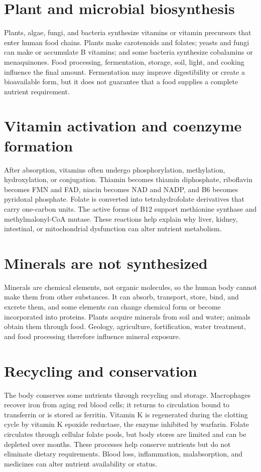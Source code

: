 \section{Plant and microbial biosynthesis}
Plants, algae, fungi, and bacteria synthesize vitamins or vitamin precursors that enter human food chains. Plants make carotenoids and folates; yeasts and fungi can make or accumulate B vitamins; and some bacteria synthesize cobalamins or menaquinones. Food processing, fermentation, storage, soil, light, and cooking influence the final amount. Fermentation may improve digestibility or create a bioavailable form, but it does not guarantee that a food supplies a complete nutrient requirement. \cite{odsA,odsFolate,odsB12,odsK}

\section{Vitamin activation and coenzyme formation}
After absorption, vitamins often undergo phosphorylation, methylation, hydroxylation, or conjugation. Thiamin becomes thiamin diphosphate, riboflavin becomes FMN and FAD, niacin becomes NAD and NADP, and B6 becomes pyridoxal phosphate. Folate is converted into tetrahydrofolate derivatives that carry one-carbon units. The active forms of B12 support methionine synthase and methylmalonyl-CoA mutase. These reactions help explain why liver, kidney, intestinal, or mitochondrial dysfunction can alter nutrient metabolism. \cite{odsThiamin,odsRiboflavin,odsNiacin,odsB6,odsFolate,odsB12}

\section{Minerals are not synthesized}
Minerals are chemical elements, not organic molecules, so the human body cannot make them from other substances. It can absorb, transport, store, bind, and excrete them, and some elements can change chemical form or become incorporated into proteins. Plants acquire minerals from soil and water; animals obtain them through food. Geology, agriculture, fortification, water treatment, and food processing therefore influence mineral exposure. \cite{odsIron,napElectrolytes}

\section{Recycling and conservation}
The body conserves some nutrients through recycling and storage. Macrophages recover iron from aging red blood cells; it returns to circulation bound to transferrin or is stored as ferritin. Vitamin K is regenerated during the clotting cycle by vitamin K epoxide reductase, the enzyme inhibited by warfarin. Folate circulates through cellular folate pools, but body stores are limited and can be depleted over months. These processes help conserve nutrients but do not eliminate dietary requirements. Blood loss, inflammation, malabsorption, and medicines can alter nutrient availability or status. \cite{odsIron,odsK,odsFolate}

